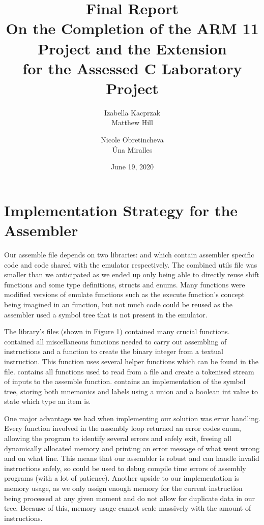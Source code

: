 \documentclass[11pt]{article}
\title{Final Report\\
\large On the Completion of the ARM 11 Project and the Extension \\
       for the Assessed C Laboratory Project}
\author{
    Izabella Kacprzak\\
    Matthew Hill
    \and 
    Nicole Obretincheva\\
    \'Una Miralles}
\date{June 19, 2020}
\begin{document}
\maketitle

\section{Implementation Strategy for the Assembler}
Our assemble file depends on two libraries:  and  which contain assembler specific code and code shared with the emulator respectively. 
The combined utils file was smaller than we anticipated as we ended up only being able to directly reuse shift functions and some type definitions, structs and enums.
Many functions were modified versions of emulate functions such as the execute function’s concept being imagined in an  function, but not much code could be reused as the assembler used a symbol tree that is not present in the emulator.
\par The  library’s files (shown in Figure 1) contained many crucial functions.
 contained all miscellaneous functions needed to carry out assembling of instructions and a function  to create the binary integer from a textual instruction. 
This function uses several helper functions which can be found in the  file.
 contains all functions used to read from a file and create a tokenised stream of inputs to the assemble function. 
 contains an implementation of the symbol tree, storing both mnemonics and labels using a union and a boolean int value to state which type an item is. 

\par One major advantage we had when implementing our solution was error handling. 
Every function involved in the assembly loop returned an error codes enum, allowing the program to identify several errors and safely exit, freeing all dynamically allocated memory and printing an error message of what went wrong and on what line. 
This means that our assembler is robust and can handle invalid instructions safely, so could be used to debug compile time errors of assembly programs (with a lot of patience). 
Another upside to our implementation is memory usage, as we only assign enough memory for the current instruction being processed at any given moment and do not allow for duplicate data in our tree. 
Because of this, memory usage cannot scale massively with the amount of instructions.
\end{document}
